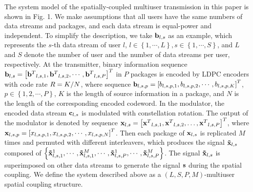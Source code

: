 \documentclass[conference]{IEEEtran}
\begin{document}
The system model of the spatially-coupled multiuser transmission in this paper is shown in Fig. 1. We make assumptions that all users have the same numbers of data streams and packages, and each data stream is equal-power and independent. To simplify the description, we take ${{\bf{b}}_{l,s}}$ as an example, which represents the $s$-th data stream of user $l$, $l \in \left\{ {1, \cdots ,L} \right\},s \in \left\{ {1, \cdots ,S} \right\}$, and $L$ and $S$ denote the number of user and the number of data streams per user, respectively. At the transmitter, binary information sequence ${{\bf{b}}_{l,s}} = {\left[ {{{\bf{b}}^T}_{l,s,1},{{\bf{b}}^T}_{l,s,2}, \cdots ,{{\bf{b}}^T}_{l,s,P}} \right]^T}$ in $P$ packages is encoded by LDPC encoders with code rate $R = {K \mathord{\left/
 {\vphantom {K N}} \right.
 \kern-\nulldelimiterspace} N}$, where sequence ${{\bf{b}}_{l,s,p}} = {\left[ {{b_{l,s,p,1}},{b_{l,s,p,2}}, \cdots ,{b_{l,s,p,K}}} \right]^T}$, $p \in \left\{ {1,2, \cdots ,P} \right\}$, $K$ is the length of source information in a package, and $N$ is the length of the corresponding encoded codeword. In the modulator, the encoded data stream ${{\bf{c}}_{l,s}}$ is modulated with constellation rotation. The output of the modulator is denoted by sequence ${{\bf{x}}_{l,s}} = {\left[ {{{\bf{x}}^T}_{l,s,1},{{\bf{x}}^T}_{l,s,2}, \ldots ,{{\bf{x}}^T}_{l,s,P}} \right]^T}$, where ${{\bf{x}}_{l,s,p}} = {\left[ {{x_{l,s,p,1}},{x_{l,s,p,2}}, \cdots ,{x_{l,s,p,N}}} \right]^T}$. Then each package of ${{\bf{x}}_{l,s}}$ is replicated $M$ times and permuted with different interleavers, which produces the signal ${{\bf{\tilde x}}_{l,s}}$ composed of $\left\{ {{\bf{\tilde x}}_{l,s,1}^1, \cdots ,{\bf{\tilde x}}_{l,s,1}^M, \cdots ,{\bf{\tilde x}}_{l,s,P}^1, \cdots ,{\bf{\tilde x}}_{l,s,P}^M} \right\}$. The signal ${{\bf{\tilde x}}_{l,s}}$ is superimposed on other data streams to generate the signal ${\bf{s}}$ during the spatial coupling. We define the system described above as a $\left( {L,S,P,M} \right)$-multiuser spatial coupling structure.
\end{document}
